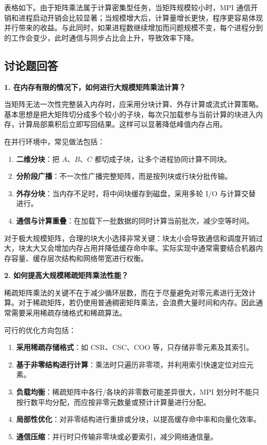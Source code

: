\documentclass[12pt,a4paper]{ctexart}
\begin{document}
表格如下。由于矩阵乘法属于计算密集型任务，当矩阵规模较小时，MPI 通信开销和进程启动开销会比较显著；当规模增大后，计算量增长更快，程序更容易体现并行带来的收益。与此同时，如果进程数继续增加而问题规模不变，每个进程分到的工作会变少，此时通信与同步占比会上升，导致效率下降。

\subsection*{讨论题回答}
\textbf{1. 在内存有限的情况下，如何进行大规模矩阵乘法计算？}

当矩阵无法一次性完整装入内存时，应采用分块计算、外存计算或流式计算策略。基本思想是把大矩阵切分成多个较小的子块，每次只加载参与当前计算的块进入内存，计算局部乘积后立即写回结果。这样可以显著降低峰值内存占用。

在并行环境中，常见做法包括：
\begin{enumerate}[itemsep=0.3em]
  \item \textbf{二维分块}：把 $A$、$B$、$C$ 都切成子块，让多个进程协同计算不同块。
  \item \textbf{分阶段广播}：不一次性广播完整矩阵，而是按列块或行块分批传输。
  \item \textbf{外存分块}：当内存不足时，将中间块缓存到磁盘，采用多轮 I/O 与计算交替进行。
  \item \textbf{通信与计算重叠}：在加载下一批数据的同时计算当前批次，减少空等时间。
\end{enumerate}

对于极大规模矩阵，合理的块大小选择非常关键：块太小会导致通信和调度开销过大，块太大又会增加内存占用并降低缓存命中率。实际实现中通常需要结合机器内存容量、缓存层次结构和网络带宽进行权衡。

\textbf{2. 如何提高大规模稀疏矩阵乘法性能？}

稀疏矩阵乘法的关键不在于减少循环层数，而在于尽量避免对零元素进行无效计算。对于稀疏矩阵，若仍使用普通稠密矩阵乘法，会浪费大量时间和内存。因此通常需要采用稀疏存储格式和稀疏算法。

可行的优化方向包括：
\begin{enumerate}[itemsep=0.3em]
  \item \textbf{采用稀疏存储格式}：如 CSR、CSC、COO 等，只存储非零元素及其索引。
  \item \textbf{基于非零结构进行计算}：乘法时只遍历非零项，并利用索引快速定位对应元素。
  \item \textbf{负载均衡}：稀疏矩阵中各行/各块的非零数可能差异很大，MPI 划分时不能只按行数平均分配，而应按非零元数量或预计计算量进行分配。
  \item \textbf{局部性优化}：对非零结构进行重排或分块，以提高缓存命中率和向量化效率。
  \item \textbf{通信压缩}：并行时只传输非零块或必要索引，减少网络通信量。
\end{enumerate}
\end{document}
